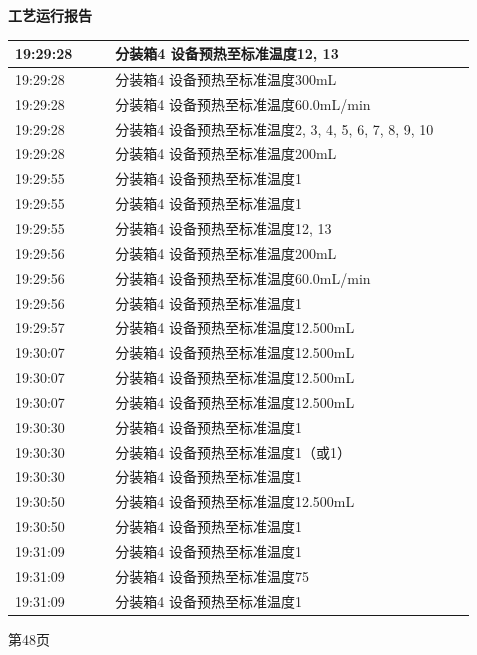 \documentclass[UTF8,10pt,a4paper,fontset=fandol]{ctexart}
\begin{document}
\hfill
\begin{minipage}[t]{0.48\linewidth}
\centering
\textbf{工艺运行报告}

\vspace{2mm}
\scriptsize
\begin{tabular}{|p{0.20\linewidth}|p{0.72\linewidth}|}
\hline
19:29:28 & 分装箱4 设备预热至标准温度12, 13 \\ \hline
19:29:28 & 分装箱4 设备预热至标准温度300mL \\ \hline
19:29:28 & 分装箱4 设备预热至标准温度60.0mL/min \\ \hline
19:29:28 & 分装箱4 设备预热至标准温度2, 3, 4, 5, 6, 7, 8, 9, 10 \\ \hline
19:29:28 & 分装箱4 设备预热至标准温度200mL \\ \hline
19:29:55 & 分装箱4 设备预热至标准温度1 \\ \hline
19:29:55 & 分装箱4 设备预热至标准温度1 \\ \hline
19:29:55 & 分装箱4 设备预热至标准温度12, 13 \\ \hline
19:29:56 & 分装箱4 设备预热至标准温度200mL \\ \hline
19:29:56 & 分装箱4 设备预热至标准温度60.0mL/min \\ \hline
19:29:56 & 分装箱4 设备预热至标准温度1 \\ \hline
19:29:57 & 分装箱4 设备预热至标准温度12.500mL \\ \hline
19:30:07 & 分装箱4 设备预热至标准温度12.500mL \\ \hline
19:30:07 & 分装箱4 设备预热至标准温度12.500mL \\ \hline
19:30:07 & 分装箱4 设备预热至标准温度12.500mL \\ \hline
19:30:30 & 分装箱4 设备预热至标准温度1 \\ \hline
19:30:30 & 分装箱4 设备预热至标准温度1（或1） \\ \hline
19:30:30 & 分装箱4 设备预热至标准温度1 \\ \hline
19:30:50 & 分装箱4 设备预热至标准温度12.500mL \\ \hline
19:30:50 & 分装箱4 设备预热至标准温度1 \\ \hline
19:31:09 & 分装箱4 设备预热至标准温度1 \\ \hline
19:31:09 & 分装箱4 设备预热至标准温度75 \\ \hline
19:31:09 & 分装箱4 设备预热至标准温度1 \\ \hline
\end{tabular}

\vspace{2mm}
第48页
\end{minipage}
\end{document}
